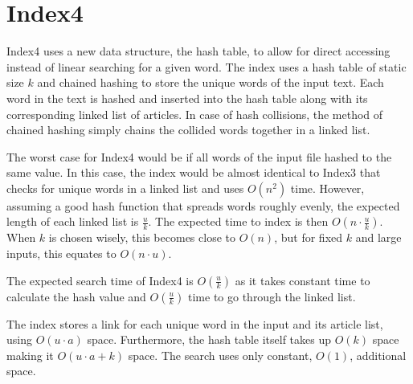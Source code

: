 \section{Index4}
\label{section:Index4}

Index4 uses a new data structure, the hash table, to allow for direct accessing instead of linear searching for a given word. The index uses a hash table of static size $k$ and chained hashing to store the unique words of the input text. Each word in the text is hashed and inserted into the hash table along with its corresponding linked list of articles. In case of hash collisions, the method of chained hashing simply chains the collided words together in a linked list. 

The worst case for Index4 would be if all words of the input file hashed to the same value. In this case, the index would be almost identical to Index3 that checks for unique words in a linked list and uses $O(n^2)$ time. However, assuming a good hash function that spreads words roughly evenly, the expected length of each linked list is $\frac{u}{k}$. The expected time to index is then $O(n\cdot \frac{u}{k})$. When $k$ is chosen wisely, this becomes close to $O(n)$, but for fixed $k$ and large inputs, this equates to $O(n\cdot u)$. 



The expected search time of Index4 is $O(\frac{u}{k})$ as it takes constant time to calculate the hash value and $O(\frac{u}{k})$ time to go through the linked list. 

The index stores a link for each unique word in the input and its article list, using $O(u\cdot a)$ space. Furthermore, the hash table itself takes up $O(k)$ space making it $O(u\cdot a+k)$ space. The search uses only constant, $O(1)$, additional space. 
